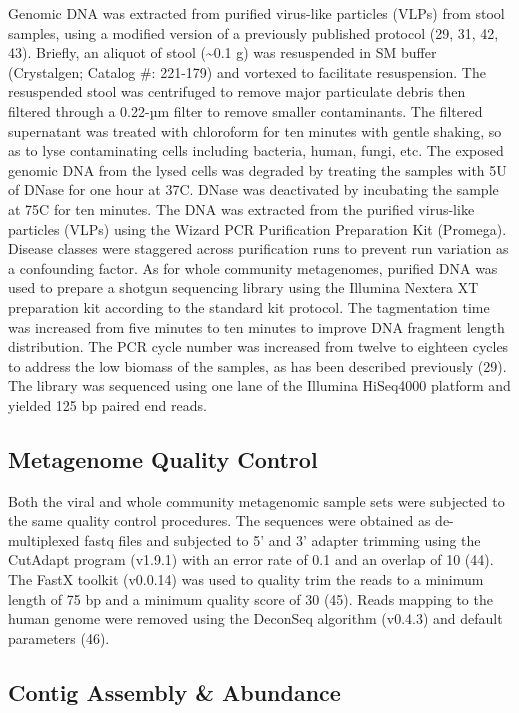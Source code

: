 \documentclass[12pt,]{article}
\begin{document}
Genomic DNA was extracted from purified virus-like particles (VLPs) from
stool samples, using a modified version of a previously published
protocol (29, 31, 42, 43). Briefly, an aliquot of stool
(\textasciitilde{}0.1 g) was resuspended in SM buffer (Crystalgen;
Catalog \#: 221-179) and vortexed to facilitate resuspension. The
resuspended stool was centrifuged to remove major particulate debris
then filtered through a 0.22-µm filter to remove smaller contaminants.
The filtered supernatant was treated with chloroform for ten minutes
with gentle shaking, so as to lyse contaminating cells including
bacteria, human, fungi, etc. The exposed genomic DNA from the lysed
cells was degraded by treating the samples with 5U of DNase for one hour
at 37C. DNase was deactivated by incubating the sample at 75C for ten
minutes. The DNA was extracted from the purified virus-like particles
(VLPs) using the Wizard PCR Purification Preparation Kit (Promega).
Disease classes were staggered across purification runs to prevent run
variation as a confounding factor. As for whole community metagenomes,
purified DNA was used to prepare a shotgun sequencing library using the
Illumina Nextera XT preparation kit according to the standard kit
protocol. The tagmentation time was increased from five minutes to ten
minutes to improve DNA fragment length distribution. The PCR cycle
number was increased from twelve to eighteen cycles to address the low
biomass of the samples, as has been described previously (29). The
library was sequenced using one lane of the Illumina HiSeq4000 platform
and yielded 125 bp paired end reads.

\subsection{Metagenome Quality
Control}\label{metagenome-quality-control}

Both the viral and whole community metagenomic sample sets were
subjected to the same quality control procedures. The sequences were
obtained as de-multiplexed fastq files and subjected to 5' and 3'
adapter trimming using the CutAdapt program (v1.9.1) with an error rate
of 0.1 and an overlap of 10 (44). The FastX toolkit (v0.0.14) was used
to quality trim the reads to a minimum length of 75 bp and a minimum
quality score of 30 (45). Reads mapping to the human genome were removed
using the DeconSeq algorithm (v0.4.3) and default parameters (46).

\subsection{Contig Assembly \&
Abundance}\label{contig-assembly-abundance}
\end{document}
